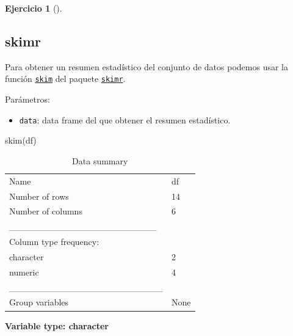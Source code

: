 \documentclass[
  spanish,
  a4paper,
]{scrreport}
\newenvironment{Shaded}{\begin{snugshade}}{\end{snugshade}}
\newcommand{\FunctionTok}[1]{\textcolor[rgb]{0.28,0.35,0.67}{#1}}
\newcommand{\NormalTok}[1]{\textcolor[rgb]{0.00,0.23,0.31}{#1}}
\providecommand{\tightlist}{%
  \setlength{\itemsep}{0pt}\setlength{\parskip}{0pt}}
\theoremstyle{definition}
\newtheorem{exercise}{Ejercicio}[chapter]
\theoremstyle{remark}
\begin{document}
\begin{exercise}[]
\begin{enumerate}
\begin{tcolorbox}
  \section{skimr}

  Para obtener un resumen estadístico del conjunto de datos podemos usar
  la función
  \href{https://www.rdocumentation.org/packages/skimr/versions/2.2.1/topics/skim}{\texttt{skim}}
  del paquete
  \href{https://www.rdocumentation.org/packages/skimr}{\texttt{skimr}}.

  Parámetros:

  \begin{itemize}
  \tightlist
  \item
    \texttt{data}: data frame del que obtener el resumen estadístico.
  \end{itemize}

\begin{Shaded}
\begin{Highlighting}[]
\FunctionTok{skim}\NormalTok{(df)}
\end{Highlighting}
\end{Shaded}

  \begin{longtable}[]{@{}ll@{}}
  \caption{Data summary}\tabularnewline
  \toprule\noalign{}
  \endfirsthead
  \endhead
  \bottomrule\noalign{}
  \endlastfoot
  Name & df \\
  Number of rows & 14 \\
  Number of columns & 6 \\
  \_\_\_\_\_\_\_\_\_\_\_\_\_\_\_\_\_\_\_\_\_\_\_ & \\
  Column type frequency: & \\
  character & 2 \\
  numeric & 4 \\
  \_\_\_\_\_\_\_\_\_\_\_\_\_\_\_\_\_\_\_\_\_\_\_\_ & \\
  Group variables & None \\
  \end{longtable}

  \textbf{Variable type: character}


\end{tcolorbox}
\end{enumerate}
\end{exercise}
\end{document}
